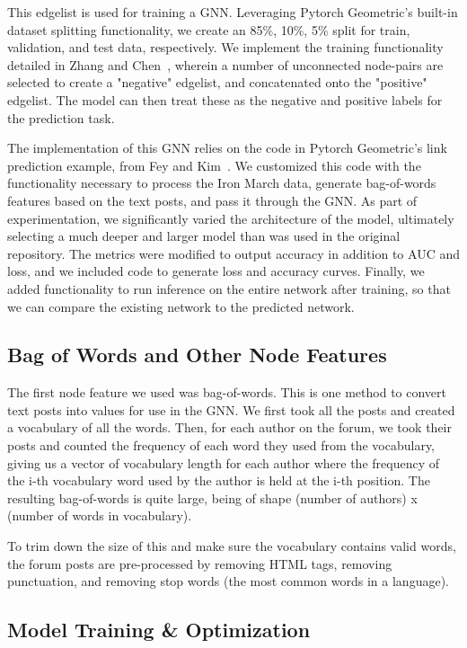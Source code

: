 \documentclass[10pt,twocolumn,letterpaper]{article}
\begin{document}
This edgelist is used for training a GNN. Leveraging Pytorch Geometric's built-in dataset splitting functionality, we create an 85\%, 10\%, 5\% split for train, validation, and test data, respectively. We implement the training functionality detailed in Zhang and Chen~\cite{SEAL}, wherein a number of unconnected node-pairs are selected to create a "negative" edgelist, and concatenated onto the "positive" edgelist. The model can then treat these as the negative and positive labels for the prediction task. 

The implementation of this GNN relies on the code in Pytorch Geometric's link prediction example, from Fey and Kim~\cite{pytorch-geometric}. We customized this code with the functionality necessary to process the Iron March data, generate bag-of-words features based on the text posts, and pass it through the GNN. As part of experimentation, we significantly varied the architecture of the model, ultimately selecting a much deeper and larger model than was used in the original repository. The metrics were modified to output accuracy in addition to AUC and loss, and we included code to generate loss and accuracy curves. Finally, we added functionality to run inference on the entire network after training, so that we can compare the existing network to the predicted network.

\subsection{Bag of Words and Other Node Features}

The first node feature we used was bag-of-words. This is one method to convert text posts into values for use in the GNN. We first took all the posts and created a vocabulary of all the words. Then, for each author on the forum, we took their posts and counted the frequency of each word they used from the vocabulary, giving us a vector of vocabulary length for each author where the frequency of the i-th vocabulary word used by the author is held at the i-th position. The resulting bag-of-words is quite large, being of shape (number of authors) x (number of words in vocabulary). 

To trim down the size of this and make sure the vocabulary contains valid words, the forum posts are pre-processed by removing HTML tags, removing punctuation, and removing stop words (the most common words in a language).

\subsection{Model Training \& Optimization}
\end{document}

